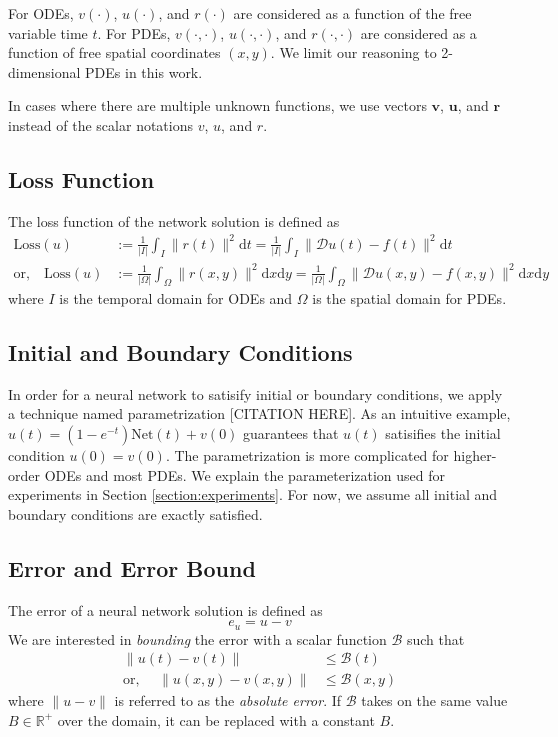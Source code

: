 \documentclass{article}
\newcommand{\vect}[1]{\boldsymbol{\mathbf{#1}}}
\newcommand{\Err}{e}
\newcommand{\Bound}{\mathcal{B}}
\newcommand{\Loss}{\mathrm{Loss}}
\newcommand{\Net}{\mathrm{Net}}
\begin{document}
    For ODEs, $v(\cdot)$, $u(\cdot)$, and $r(\cdot)$ are considered as a function of the free variable time $t$.
    For PDEs, $v(\cdot, \cdot)$, $u(\cdot, \cdot)$, and $r(\cdot, \cdot)$ are considered as a function of free spatial coordinates $(x, y)$.
    We limit our reasoning to 2-dimensional PDEs in this work.

    In cases where there are multiple unknown functions, we use vectors $\vect{v}$, $\vect{u}$, and $\vect{r}$ instead of the scalar notations $v$, $u$, and $r$.

\subsection{Loss Function}
    The loss function of the network solution is defined as 
    \begin{align}
        \Loss{}(u) &:= \frac{1}{|I|} \int_{I} \|r(t)\|^2 \mathrm{d}t 
            = \frac{1}{|I|} \int_{I} \|\mathcal{D}u(t) - f(t)\|^2 \mathrm{d}t \\
        \text{or,} \quad 
        \Loss{}(u) &:= \frac{1}{|\Omega|} \int_{\Omega} \|r(x, y)\|^2 \mathrm{d}x\mathrm{d}y
            = \frac{1}{|\Omega|} \int_{\Omega} \|\mathcal{D}u(x, y) - f(x, y)\|^2 \mathrm{d}x\mathrm{d}y
    \end{align}
    where $I$ is the temporal domain for ODEs and $\Omega$ is the spatial domain for PDEs.

\subsection{Initial and Boundary Conditions}\label{section:initial-and-boundary-conditions}
    In order for a neural network to satisify initial or boundary conditions, we apply a technique named parametrization [CITATION HERE]. 
    As an intuitive example, $u(t) = (1 - e^{-t}) \Net(t) + v(0)$ guarantees that $u(t)$ satisifies the initial condition $u(0)=v(0)$. 
    The parametrization is more complicated for higher-order ODEs and most PDEs. We explain the parameterization used for experiments in Section \ref{section:experiments}. 
    For now, we assume all initial and boundary conditions are exactly satisfied.

\subsection{Error and Error Bound}
    The error of a neural network solution is defined as 
    \begin{equation}\label{eq:err-definition-master}
        \Err_u= u - v
    \end{equation}
    We are interested in \textit{bounding} the error with a scalar function $\Bound$ such that
    \begin{align}
        \|u(t) - v(t)\| &\leq \Bound(t) \\
        \text{or, } \quad \|u(x, y) - v(x, y)\| &\leq \Bound(x, y)
    \end{align}
    where $\|u - v\|$ is referred to as the \textit{absolute error}.
    If $\Bound$ takes on the same value $B \in \mathbb{R}^{+}$ over the domain, it can be replaced with a constant $B$.
\end{document}
